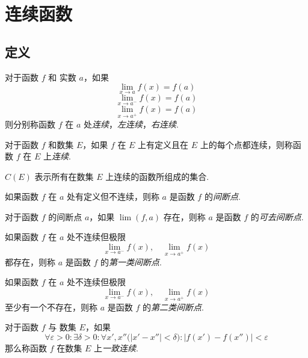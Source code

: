 \section{连续函数}
\subsection{定义}
\begin{definition}
    对于函数 $f$ 和 实数 $a$，如果
    \[\lim_{x \rightarrow a} f(x) = f(a)\]
    \[\lim_{x \rightarrow a^-} f(x) = f(a)\]
    \[\lim_{x \rightarrow a^+} f(x) = f(a)\]
    则分别称函数 $f$ 在 $a$ 处\emph{连续}，\emph{左连续}，\emph{右连续}.
\end{definition}\vspace{9pt}

\begin{definition}
    对于函数 $f$ 和数集 $E$，如果 $f$ 在 $E$ 上有定义且在 $E$ 上的每个点都连续，则称函数 $f$ 在 $E$ 上\emph{连续}.
\end{definition}\vspace{9pt}

\begin{definition}
    $C(E)$ 表示所有在数集 $E$ 上连续的函数所组成的集合.
\end{definition}\vspace{9pt}

\begin{definition}
    如果函数 $f$ 在 $a$ 处有定义但不连续，则称 $a$ 是函数 $f$ 的\emph{间断点}.

    对于函数 $f$ 的间断点 $a$，如果 $\lim(f,a)$ 存在，则称 $a$ 是函数 $f$ 的\emph{可去间断点}.
\end{definition}\vspace{9pt}

\begin{subdefinition}
    如果函数 $f$ 在 $a$ 处不连续但极限
    \[\lim_{x \rightarrow a^-} f(x),\quad \lim_{x \rightarrow a^+}f(x)\]
    都存在，则称 $a$ 是函数 $f$ 的\emph{第一类间断点}.
\end{subdefinition}

\begin{subdefinition}
    如果函数 $f$ 在 $a$ 处不连续但极限
    \[\lim_{x \rightarrow a^-}f(x), \quad \lim_{x \rightarrow a^+}f(x)\]
    至少有一个不存在，则称 $a$ 是函数 $f$ 的\emph{第二类间断点}.
\end{subdefinition}\vspace{9pt}

\begin{definition}
    对于函数 $f$ 与 数集 $E$，如果
    \[\forall \varepsilon > 0: \exists \delta > 0: \forall x', x'' \bigl(\lvert x' - x''\rvert < \delta\bigr): \bigl| f(x') - f(x'')\bigr| < \varepsilon\]
    那么称函数 $f$ 在数集 $E$ 上\emph{一致连续}.
\end{definition}

